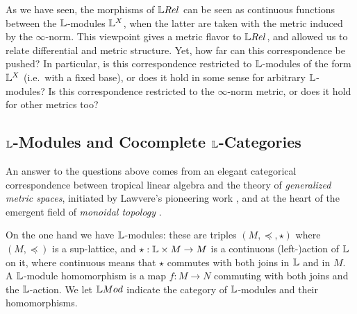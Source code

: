 

As we have seen, the morphisms of $\LREL$ can be seen as continuous functions between the $\mathbb{L}$-modules $\mathbb{L}^{X}$, when the latter are taken with the metric induced by the $\infty$-norm. This viewpoint gives a metric flavor to $\LREL$, and allowed us to relate differential and metric structure. Yet, how far can this correspondence be pushed?
In particular, is this correspondence restricted to $\mathbb{L}$-modules of the form $\mathbb{L}^{X}$ (i.e.~with a fixed base), or does it hold in some sense for arbitrary $\mathbb{L}$-modules? Is this correspondence restricted to the $\infty$-norm metric, or does it hold for other metrics too?

\subsection{$\mathbb{L}$-Modules and Cocomplete $\mathbb{L}$-Categories}

An answer to the questions above comes from an elegant categorical correspondence between tropical linear algebra and the theory of \emph{generalized metric spaces}, initiated by Lawvere's pioneering work \cite{Lawvere1973}, and at the heart of the emergent field of \emph{monoidal topology} \cite{Hofmann2014, Stubbe2014}.

 
%
%
%


On the one hand we have $\mathbb{L}$-modules: these are triples $(M,\preceq, \star)$ where $(M, \preceq)$ is a sup-lattice, and $\star: \mathbb{L} \times M \to M$ is a continuous (left-)action of $\mathbb{L}$ on it, where continuous means that $\star$ commutes with both joins in $\mathbb{L}$ and in $M$. %
A $\mathbb{L}$-module homomorphism is a map $f:M\to N$ commuting with both joins and the $\mathbb{L}$-action. We let $\Mod$ indicate the category of $\mathbb{L}$-modules and their homomorphisms. 
 
